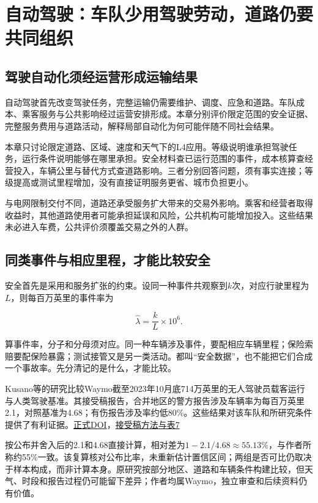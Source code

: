 \documentclass[UTF8,fontset=windows,12pt,a4paper,oneside,openany]{ctexbook}
\begin{document}
\chapter{自动驾驶：车队少用驾驶劳动，道路仍要共同组织}\label{ch:10}

\section{驾驶自动化须经运营形成运输结果}

自动驾驶首先改变驾驶任务，完整运输仍需要维护、调度、应急和道路。车队成本、乘客服务与公共影响经过运营安排形成。本章分别评价限定范围的安全证据、完整服务费用与道路活动，解释局部自动化为何可能伴随不同社会结果。

本章只讨论限定道路、区域、速度和天气下的L4应用。等级说明谁承担驾驶任务，运行条件说明能够在哪里承担。安全材料查已运行范围的事件，成本核算查经营投入，车辆公里与替代方式查道路影响。三者分别回答问题，须有事实连接；等级提高或测试里程增加，没有直接证明服务更省、城市负担更小。

与电网限制交付不同，道路还承受服务扩大带来的交易外影响。乘客和经营者取得收益时，其他道路使用者可能承担延误和风险，公共机构可能增加投入。这些结果未必进入车费，公共评价须覆盖交易之外的人群。

\section{同类事件与相应里程，才能比较安全}

安全首先是采用和服务扩张的约束。设同一种事件共观察到\(k\)次，对应行驶里程为\(L\)，则每百万英里的事件率为

\[
\hat\lambda=\frac{k}{L}\times10^6.
\tag{10-1}
\]

算事件率，分子和分母须对应。同一种车辆涉及事件，要配相应车辆里程；保险索赔要配保险暴露；测试接管又是另一类活动。都叫“安全数据”，也不能把它们合成一个事故率。先分清记的是什么，才能比较。

Kusano等的研究比较Waymo截至2023年10月底714万英里的无人驾驶员载客运行与人类驾驶基准。其接受稿报告，合并地区的警方报告涉及车辆率为每百万英里2.1，对照基准为4.68；有伤报告涉及率约低80\%。这些结果对该车队和所研究条件提供了有利证据。\href{https://doi.org/10.1080/15389588.2024.2380786}{正式DOI}，\href{https://arxiv.org/html/2312.12675v3}{接受稿方法与表7}

按公布并舍入后的2.1和4.68直接计算，相对差为\(1-2.1/4.68\approx55.13\%\)，与作者所称约55\%一致。该复算核对公布比率，未重新估计置信区间；两组是否可比仍取决于样本构成，而非计算本身。原研究按部分地区、道路和车辆条件构建比较，但天气、时段和报告过程仍可能留下差异；作者均属Waymo，独立审查和后续资料仍有价值。
\end{document}
